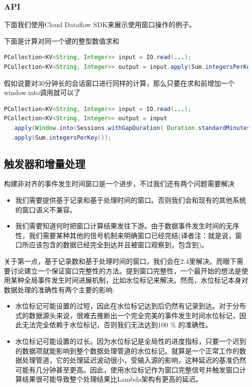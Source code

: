 \documentclass[oneside]{ctexbook}
\begin{document}
\subsubsection{API}

下面我们使用Cloud Dataflow SDK来展示使用窗口操作的例子。

下面是计算对同一个键的整型数值求和

\begin{lstlisting}[language=java]
PCollection<KV<String, Integer>> input = IO.read(...);
PCollection<KV<String, Integer>> output = input.apply(Sum.integersPerKey());
\end{lstlisting}

假如说要对30分钟长的会话窗口进行同样的计算，那么只要在求和前增加一个window.into调用就可以了

\begin{lstlisting}[language=java]
PCollection<KV<String, Integer>> input = IO.read(...);
PCollection<KV<String, Integer>> output = input
  .apply(Window.into(Sessions.withGapDuration( Duration.standardMinutes(30))))
  .apply(Sum.integersPerKey());
\end{lstlisting}

\subsection{触发器和增量处理}

构建非对齐的事件发生时间窗口是一个进步，不过我们还有两个问题需要解决

\begin{itemize}
\item 我们需要提供基于记录和基于处理时间的窗口。否则我们会和现有的其他系统的窗口语义不兼容。
\item 我们需要知道何时把窗口计算结果发往下游。由于数据事件发生时间的无序性，我们需要某种其他的信号机制来明确窗口已经完结(译者注：就是说，窗口所应该包含的数据已经完全到达并且被窗口观察到，包含到)。
\end{itemize}

关于第一点，基于记录数和基于处理时间的窗口，我们会在2.4里解决。而眼下需要讨论建立一个保证窗口完整性的方法。提到窗口完整性，一个最开始的想法是使用某种全局事件发生时间进展机制，比如水位标记来解决。然而，水位标记本身对数据处理的准确性有两个主要的影响:

\begin{itemize}
\item 水位标记可能设置的过短，因此在水位标记达到后仍然有记录到达。对于分布式的数据源头来说，很难去推断出一个完全完美的事件发生时间水位标记，因此无法完全依赖于水位标记，否则我们无法达到100 \% 的准确性。
\item 水位标记可能设置的过长。因为水位标记是全局性的进度指标，只要一个迟到的数据项就能影响到整个数据处理管道的水位标记。就算是一个正常工作的数据处理管道，它的处理延迟波动很小，受输入源的影响，这种延迟的基准仍然可能有几分钟甚至更高。因此，使用水位标记作为窗口完整信号并触发窗口计算结果很可能导致整个处理结果比Lambda架构有更高的延迟。
\end{itemize}
\end{document}
